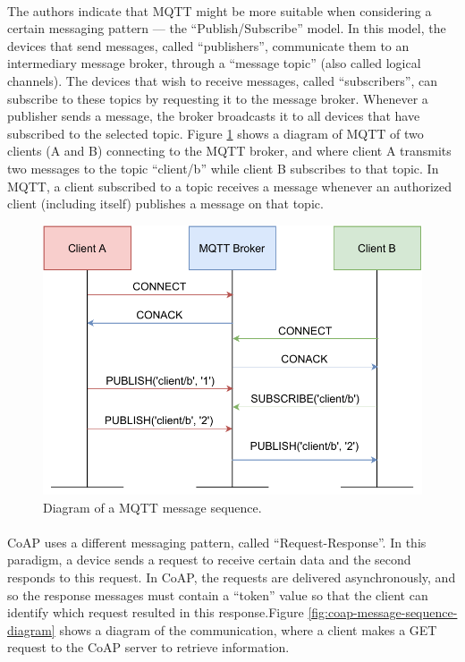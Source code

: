 \paragraph{} The authors indicate that \acs{MQTT} might be more suitable when considering a certain messaging pattern — the ``Publish/Subscribe'' model. In this model, the devices that send messages, called ``publishers'', communicate them to an intermediary message broker, through a ``message topic'' (also called logical channels). The devices that wish to receive messages, called ``subscribers'', can subscribe to these topics by requesting it to the message broker. Whenever a publisher sends a message, the broker broadcasts it to all devices that have subscribed to the selected topic.  Figure \ref{fig:mqtt-message-sequence-diagram} shows a diagram of \acs{MQTT} of two clients (A and B) connecting to the \acs{MQTT} broker, and where client A transmits two messages to the topic ``client/b'' while client B subscribes to that topic. In \acs{MQTT}, a client subscribed to a topic receives a message whenever an authorized client (including itself) publishes a message on that topic.

\begin{figure}[H]
    \centering
    \includegraphics[width=0.63\linewidth]{images/mqtt message sequence diagram.pdf}
    \caption[Diagram of a \acs{MQTT} message sequence.]{ Diagram of a \acs{MQTT} message sequence.}
    \label{fig:mqtt-message-sequence-diagram}
\end{figure}

\paragraph{} \acs{CoAP} uses a different messaging pattern, called ``Request-Response''. In this paradigm, a device sends a request to receive certain data and the second responds to this request. In \acs{CoAP}, the requests are delivered asynchronously, and so the response messages must contain a ``token'' value so that the client can identify which request resulted in this response.Figure \ref{fig:coap-message-sequence-diagram} shows a diagram of the communication, where a client makes a GET request to the \acs{CoAP} server to retrieve information. 


